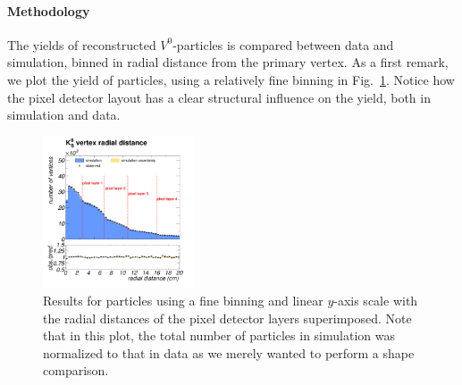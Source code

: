 \paragraph{Methodology}\label{sec:methodology}
The yields of reconstructed $V^0$-particles is compared between data and simulation, binned in radial distance from the primary vertex. As a first remark, we plot the yield of \PKzS particles, using a relatively fine binning in Fig.~\ref{fig:2017_detector}. Notice how the pixel detector layout has a clear structural influence on the yield, both in simulation and data.
\begin{figure}[h]
    \centering
    \includegraphics[width=0.40\textwidth]{Figures/c6/efficiencies/2017E_detector}
    \caption{Results for \PKzS particles using a fine binning and linear $y$-axis scale with the radial distances of the pixel detector layers superimposed. Note that in this plot, the total number of \PKzS particles in simulation was normalized to that in data as we merely wanted to perform a shape comparison.}
    \label{fig:2017_detector}
\end{figure}

